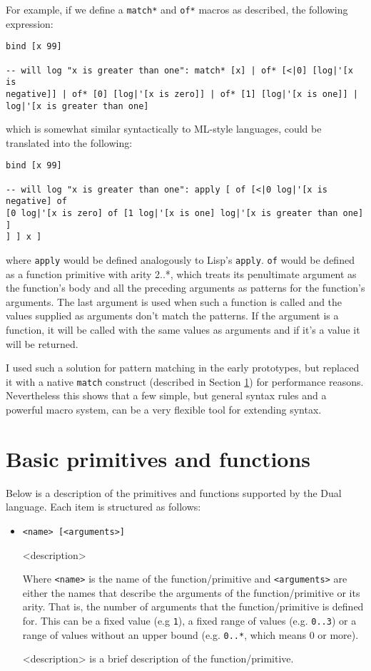 For example, if we define a \texttt{match*} and \texttt{of*} macros as
described, the following expression:
\begin{lstlisting}
bind [x 99]

-- will log "x is greater than one": match* [x] | of* [<|0] [log|'[x is
negative]] | of* [0] [log|'[x is zero]] | of* [1] [log|'[x is one]] |
log|'[x is greater than one]
\end{lstlisting}

which is somewhat similar syntactically to
ML-style\cite[Section~Algebraic datatypes and pattern matching]{standard_ml_wikipedia}
languages, could be translated into the following:
\begin{lstlisting}
bind [x 99]

-- will log "x is greater than one": apply [ of [<|0 log|'[x is negative] of
[0 log|'[x is zero] of [1 log|'[x is one] log|'[x is greater than one] ]
] ] x ]
\end{lstlisting}

where \texttt{apply} would be defined analogously to Lisp's
\texttt{apply}. \texttt{of} would be defined as a function primitive with arity
2..*, which treats its penultimate argument as the function's body and all the
preceding arguments as patterns for the function's arguments. The last argument
is used when such a function is called and the values supplied as arguments
don't match the patterns. If the argument is a function, it will be called with
the same values as arguments and if it's a value it will be returned.

I used such a solution for pattern matching in the early prototypes, but
replaced it with a native \texttt{match} construct (described in Section
\ref{sec:primitives}) for performance reasons. Nevertheless this shows that a
few simple, but general syntax rules and a powerful macro system, can be a very
flexible tool for extending syntax.


\section{Basic primitives and functions}\label{sec:primitives}
Below is a description of the primitives and functions supported by the Dual
language. Each item is structured as follows:
\begin{itemize}
    \item \texttt{<name> [<arguments>]}
    
    <description>
    
    Where \texttt{<name>} is the name of the function/primitive and
    \texttt{<arguments>} are either the names that describe the arguments of the
    function/primitive or its arity. That is, the number of arguments that the
    function/primitive is defined for. This can be a fixed value (e.g
    \texttt{1}), a fixed range of values (e.g. \texttt{0..3}) or a range of
    values without an upper bound (e.g. \texttt{0..*}, which means 0 or more).
    
    <description> is a brief description of the function/primitive.
\end{itemize}

